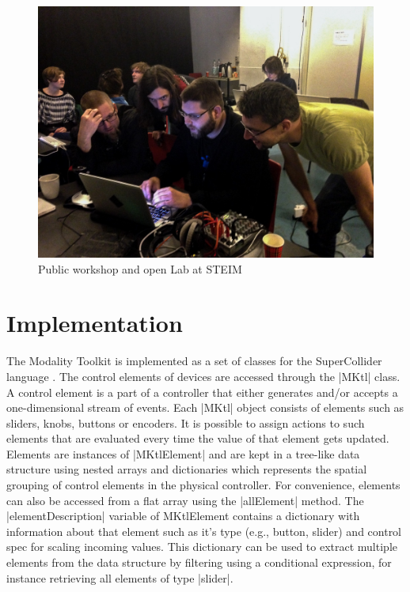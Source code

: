 \documentclass{article}
\begin{document}
\begin{figure}[h]
	\centering
		\includegraphics[width=.9\columnwidth]{../media/20140403-IMG_1667.jpg}
	\caption{Public workshop and open Lab at STEIM}
	\label{fig:media_20140403-IMG_1667}
\end{figure}



\section{Implementation}
\label{sec:implementation}


The Modality Toolkit is implemented as a set of classes for the SuperCollider language \cite{mccartney2002-ret}. 
The control elements of devices are accessed through the |MKtl| class. 
A control element is a part of a controller that either generates and/or accepts a one-dimensional stream of events. 
Each |MKtl| object consists of elements such as sliders, knobs, buttons or encoders.
It is possible to assign actions to such elements that are evaluated every time the value of that element gets updated.
Elements are instances of |MKtlElement| and are kept in a tree-like data structure using nested arrays and dictionaries which represents the spatial grouping of control elements in the physical controller. 
For convenience, elements can also be accessed from a flat array using the |allElement| method. 
The |elementDescription| variable of MKtlElement contains a dictionary with information about that element such as it's type (e.g., button, slider) and control spec for scaling incoming values. 
This dictionary can be used to extract multiple elements from the data structure by filtering using a conditional expression, for instance retrieving all elements of type |slider|.
\end{document}
